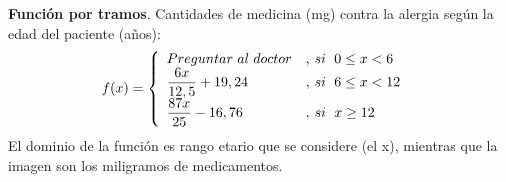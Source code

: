 \begin{myexample}
\textbf{Función por tramos}. Cantidades de medicina (mg) contra la alergia según la edad del paciente (años):\\

$$ f(x)= \left\{\begin{array}{ll}
Preguntar\hspace{3px} al\hspace{3px} doctor&,\hspace{2px} si\hspace{6px}0\leq x< 6\\
\dfrac{6x}{12,5}+19,24 &,\hspace{2px} si \hspace{6px}  6\leq x< 12\\ 
\dfrac{87x}{25}-16,76 &,\hspace{2px} si \hspace{6px} x \geq12
\end{array} \hspace{6px} \right.$$
El dominio de la función es rango etario que se considere (el x), mientras que la imagen son los miligramos de medicamentos.
\end{myexample}

